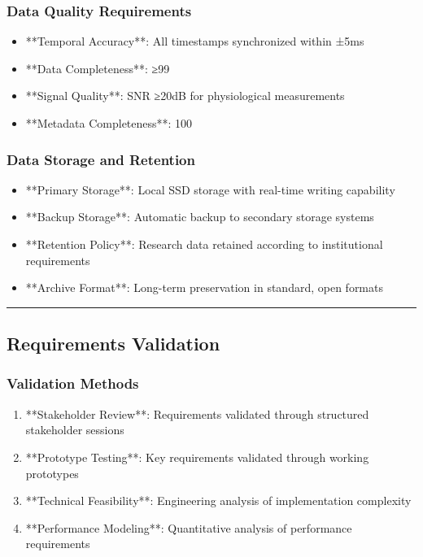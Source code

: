 \documentclass[11pt,a4paper]{report}
\begin{document}
\subsubsection{Data Quality Requirements}

\begin{itemize}
\item **Temporal Accuracy**: All timestamps synchronized within ±5ms
\item **Data Completeness**: ≥99%
\item **Signal Quality**: SNR ≥20dB for physiological measurements
\item **Metadata Completeness**: 100%

\end{itemize}
\subsubsection{Data Storage and Retention}

\begin{itemize}
\item **Primary Storage**: Local SSD storage with real-time writing capability
\item **Backup Storage**: Automatic backup to secondary storage systems
\item **Retention Policy**: Research data retained according to institutional requirements
\item **Archive Format**: Long-term preservation in standard, open formats

\end{itemize}
\hrule

\subsection{Requirements Validation}

\subsubsection{Validation Methods}

\begin{enumerate}
\item **Stakeholder Review**: Requirements validated through structured stakeholder sessions
\item **Prototype Testing**: Key requirements validated through working prototypes
\item **Technical Feasibility**: Engineering analysis of implementation complexity
\item **Performance Modeling**: Quantitative analysis of performance requirements

\end{enumerate}
\end{document}

